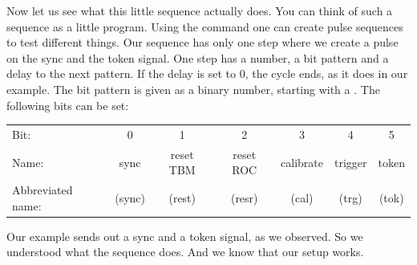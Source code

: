 Now let us see what this little sequence actually does. You can think of such a sequence as a little program. Using the command  one can create pulse sequences to test different things. Our sequence has only one step where we create a pulse on the sync and the token signal. One step has a number, a bit pattern and a delay to the next pattern. If the delay is set to 0, the cycle ends, as it does in our example. The bit pattern is given as a binary number, starting with a . The following bits can be set:
\begin{center}
\begin{tabular}{lcccccc}
    \toprule
Bit:  & 0 & 1 & 2 & 3 & 4 & 5 \\
Name: & sync & reset TBM & reset ROC & calibrate & trigger & token \\
Abbreviated name: & (sync) & (rest) & (resr) & (cal) & (trg) & (tok) \\
    \bottomrule
\end{tabular}
\end{center}

Our example sends out a sync and a token signal, as we observed. So we understood what the sequence does. And we know that our setup works.




